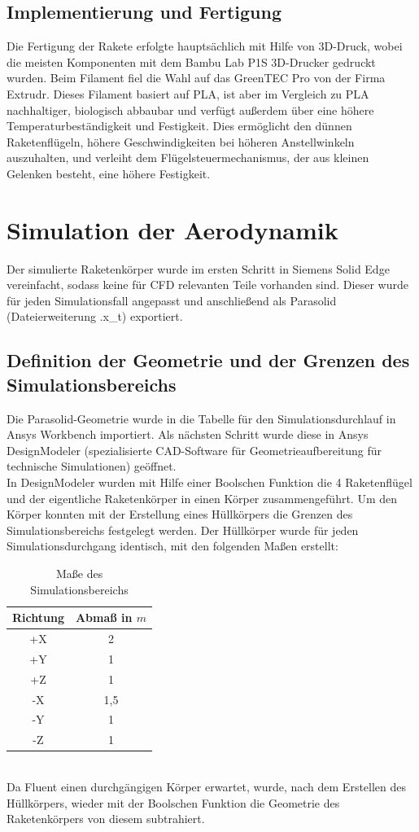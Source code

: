 \section{Implementierung und Fertigung}
\label{sec:implementation}
Die Fertigung der Rakete erfolgte hauptsächlich mit Hilfe von 3D-Druck, wobei die meisten Komponenten mit dem Bambu Lab P1S 3D-Drucker gedruckt wurden. Beim Filament fiel die Wahl auf das GreenTEC Pro von der Firma Extrudr. Dieses Filament basiert auf PLA, ist aber im Vergleich zu PLA nachhaltiger, biologisch abbaubar und verfügt außerdem über eine höhere Temperaturbeständigkeit und Festigkeit. Dies ermöglicht den dünnen Raketenflügeln, höhere Geschwindigkeiten bei höheren Anstellwinkeln auszuhalten, und verleiht dem Flügelsteuermechanismus, der aus kleinen Gelenken besteht, eine höhere Festigkeit.

\chapter{Simulation der Aerodynamik}
\label{ch:aero_simulation}
Der simulierte Raketenkörper wurde im ersten Schritt in Siemens Solid Edge vereinfacht, sodass keine für CFD relevanten Teile vorhanden sind. Dieser wurde für jeden Simulationsfall angepasst und anschließend als Parasolid (Dateierweiterung .x\_t) exportiert.

\section{Definition der Geometrie und der Grenzen des Simulationsbereichs}
\label{sec:geometry_boundaries_definition}
Die Parasolid-Geometrie wurde in die Tabelle für den Simulationsdurchlauf in Ansys Workbench importiert. Als nächsten Schritt wurde diese in Ansys DesignModeler (spezialisierte CAD-Software für Geometrieaufbereitung für technische Simulationen) geöffnet.
\\
In DesignModeler wurden mit Hilfe einer Boolschen Funktion die 4 Raketenflügel und der eigentliche Raketenkörper in einen Körper zusammengeführt. Um den Körper konnten mit der Erstellung eines Hüllkörpers die Grenzen des Simulationsbereichs festgelegt werden. Der Hüllkörper wurde für jeden Simulationsdurchgang identisch, mit den folgenden Maßen erstellt:
\begin{table}[h]
\centering
\begin{tabular}{|c|c|}
\hline
\textbf{Richtung} & \textbf{Abmaß in $m$} \\
\hline
+X & 2 \\
+Y & 1 \\
+Z & 1 \\
-X & 1,5 \\
-Y & 1 \\
-Z & 1 \\
\hline
\end{tabular}
\caption{Maße des Simulationsbereichs}
\label{tab:sim_boundaries}
\end{table}
\\Da Fluent einen durchgängigen Körper erwartet, wurde, nach dem Erstellen des Hüllkörpers, wieder mit der Boolschen Funktion die Geometrie des Raketenkörpers von diesem subtrahiert.

